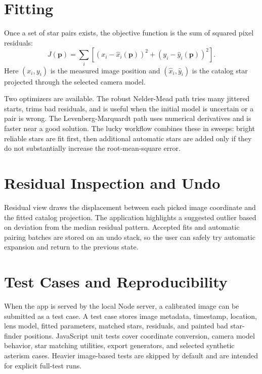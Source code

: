 \documentclass[11pt]{article}
\begin{document}
\section{Fitting}

Once a set of star pairs exists, the objective function is the sum of squared
pixel residuals:
\begin{equation}
  J(\mathbf{p}) = \sum_i
  \left[
    \left(x_i - \hat{x}_i(\mathbf{p})\right)^2
    +
    \left(y_i - \hat{y}_i(\mathbf{p})\right)^2
  \right].
\end{equation}
Here \((x_i,y_i)\) is the measured image position and
\((\hat{x}_i,\hat{y}_i)\) is the catalog star projected through the selected
camera model.

Two optimizers are available. The robust Nelder-Mead path tries many jittered
starts, trims bad residuals, and is useful when the initial model is uncertain
or a pair is wrong. The Levenberg-Marquardt path uses numerical derivatives and
is faster near a good solution. The lucky workflow combines these in sweeps:
bright reliable stars are fit first, then additional automatic stars are added
only if they do not substantially increase the root-mean-square error.

\section{Residual Inspection and Undo}

Residual view draws the displacement between each picked image coordinate and
the fitted catalog projection. The application highlights a suggested outlier
based on deviation from the median residual pattern. Accepted fits and
automatic pairing batches are stored on an undo stack, so the user can safely
try automatic expansion and return to the previous state.

\section{Test Cases and Reproducibility}

When the app is served by the local Node server, a calibrated image can be
submitted as a test case. A test case stores image metadata, timestamp,
location, lens model, fitted parameters, matched stars, residuals, and
painted bad star-finder positions. JavaScript unit tests cover coordinate
conversion, camera model behavior, star matching utilities, export generators,
and selected synthetic asterism cases. Heavier image-based tests are skipped by
default and are intended for explicit full-test runs.
\end{document}
